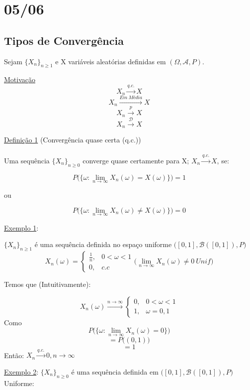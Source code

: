 \documentclass[a4paper,12pt]{article}
\begin{document}
\section{05/06 }
\subsection{Tipos de Convergência}
Sejam $\{X_n\}_{ n \ge 1}$ e X variáveis aleatórias definidas em $(\Omega,\mathscr{A},P)$.

\underline{Motivação}
$$X_n \overset{q.c.}{\longrightarrow}  X$$
$$X_n \overset{Em \ Média}{\longrightarrow}  X$$
$$X_n \overset{p}{\longrightarrow}  X$$
$$X_n \overset{\mathscr D}{\longrightarrow}  X$$

\underline{Definição 1} (Convergência quase certa (q.c.))\\
\\
Uma sequência $\{X_n\}_{ n \ge 0}$ converge quase certamente para X; $X_n \overset{q.c.}{\longrightarrow}  X$, se:

$$P\bigg(
\{\omega: \lim\limits_{n\rightarrow \infty} X_n(\omega) = X(\omega) \}
\bigg)=1 $$
\begin{center} ou \end{center}
$$P\bigg(
\{\omega: \lim\limits_{n\rightarrow \infty} X_n(\omega) \ne X(\omega) \}
\bigg)=0 $$

\underline{Exemplo 1}:

$\{X_n\}_{ n \ge 1}$ é uma sequência definida no espaço uniforme $\bigg([0,1],\mathscr B([0,1]),P\bigg)$
$$X_n(\omega)=\begin{cases}
\frac{1}{n}, & 0<\omega<1\\
0, & c.c
\end{cases} 
\bigg(
\lim\limits_{n\rightarrow \infty} X_n(\omega) \ne 0 \ Unif\bigg)
$$

Temos que (Intuitivamente):

$$X_n(\omega) \overset{n\rightarrow \infty}{\longrightarrow}\begin{cases}
0, & 0<\omega<1\\
1, & \omega = 0,1
\end{cases}  $$
Como
$$ P\bigg(
\{
\omega : \lim\limits_{n\rightarrow \infty} X_n(\omega)=0
\}
\bigg) $$
$$ 
=P\bigg((0,1)\bigg)
$$
$$
=1
$$
Então: $X_n\overset{q.c.}{\longrightarrow}0,n\rightarrow \infty$

\newpage 

\underline{Exemplo 2}:
$\{X_n\}_{ n \ge 0}$ é uma sequência definida em $\bigg([0,1],\mathscr B([0,1]),P\bigg)$ Uniforme:
\end{document}
